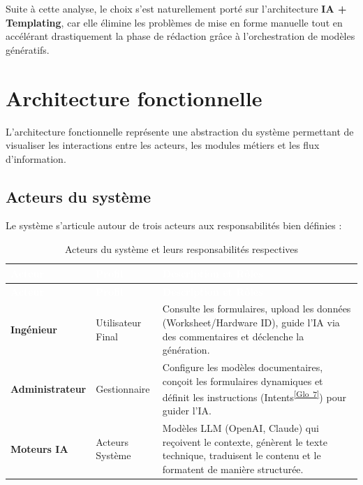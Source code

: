 \documentclass[12pt, a4paper]{report}
\newcommand{\gloref}[1]{\textsuperscript{\hyperlink{glo:#1}{[Glo~#1]}}}
\begin{document}
Suite à cette analyse, le choix s’est naturellement porté sur l'architecture \textbf{IA + Templating}, car elle élimine les problèmes de mise en forme manuelle tout en accélérant drastiquement la phase de rédaction grâce à l'orchestration de modèles génératifs.

\section{Architecture fonctionnelle}
L’architecture fonctionnelle représente une abstraction du système permettant de visualiser les interactions entre les acteurs, les modules métiers et les flux d’information.

\subsection{Acteurs du système}
Le système s'articule autour de trois acteurs aux responsabilités bien définies :

\begin{longtable}{|p{3cm}|p{3.5cm}|p{\dimexpr\textwidth-7.3cm}|}
    \hline
    \rowcolor{SecColor}
    \textcolor{white}{\textbf{Acteur}} &\textcolor{white}{\textbf{Profil}} &\textcolor{white}{\textbf{Description et Rôles}} \\ \hline
    \endfirsthead

    \hline
    \rowcolor{SecColor}
    \textcolor{white}{\textbf{Acteur}} &\textcolor{white}{\textbf{Profil}} &\textcolor{white}{\textbf{Description et Rôles}} \\ \hline
    \endhead

    \hline
    \endfoot

    \hline
    \caption{Acteurs du système et leurs responsabilités respectives} 
    \label{tab:acteurs_systeme}
    \endlastfoot

    \textbf{Ingénieur} & Utilisateur Final & Consulte les formulaires, upload les données (Worksheet/Hardware ID), guide l'IA via des commentaires et déclenche la génération. \\ \hline
    
    \textbf{Administrateur} & Gestionnaire & Configure les modèles documentaires, conçoit les formulaires dynamiques et définit les instructions (Intents\gloref{7}) pour guider l'IA. \\ \hline
    
    \textbf{Moteurs IA} & Acteurs Système & Modèles LLM (OpenAI, Claude) qui reçoivent le contexte, génèrent le texte technique, traduisent le contenu et le formatent de manière structurée. \\ 
\end{longtable}
\end{document}

